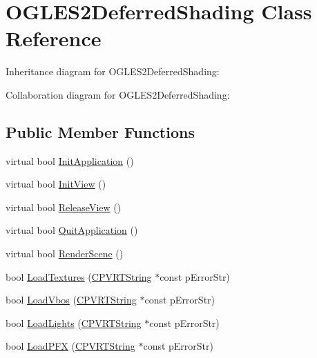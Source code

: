 \hypertarget{class_o_g_l_e_s2_deferred_shading}{\section{O\+G\+L\+E\+S2\+Deferred\+Shading Class Reference}
\label{class_o_g_l_e_s2_deferred_shading}
}


Inheritance diagram for O\+G\+L\+E\+S2\+Deferred\+Shading\+:


Collaboration diagram for O\+G\+L\+E\+S2\+Deferred\+Shading\+:
\subsection*{Public Member Functions}
\begin{DoxyCompactItemize}
\item 
virtual bool \hyperlink{class_o_g_l_e_s2_deferred_shading_a7924c712514baff744873436c9bea61e}{Init\+Application} ()
\item 
virtual bool \hyperlink{class_o_g_l_e_s2_deferred_shading_aeb9543c58a12a0c390331558cf960bdc}{Init\+View} ()
\item 
virtual bool \hyperlink{class_o_g_l_e_s2_deferred_shading_ae565e305e7a00c5ce168b5e24b528beb}{Release\+View} ()
\item 
virtual bool \hyperlink{class_o_g_l_e_s2_deferred_shading_ae259140c9281e119609d13ed8af0fbd9}{Quit\+Application} ()
\item 
virtual bool \hyperlink{class_o_g_l_e_s2_deferred_shading_aa5fb331badd65785c52334fadbbdf3b8}{Render\+Scene} ()
\item 
bool \hyperlink{class_o_g_l_e_s2_deferred_shading_ac04009ab56364958babab5b5afcd3dc7}{Load\+Textures} (\hyperlink{class_c_p_v_r_t_string}{C\+P\+V\+R\+T\+String} $\ast$const p\+Error\+Str)
\item 
bool \hyperlink{class_o_g_l_e_s2_deferred_shading_a6668143c9cf2c947a98dbf14d6d1cbc1}{Load\+Vbos} (\hyperlink{class_c_p_v_r_t_string}{C\+P\+V\+R\+T\+String} $\ast$const p\+Error\+Str)
\item 
bool \hyperlink{class_o_g_l_e_s2_deferred_shading_a602479fd9c6d9a9983e6c1c239f94f59}{Load\+Lights} (\hyperlink{class_c_p_v_r_t_string}{C\+P\+V\+R\+T\+String} $\ast$const p\+Error\+Str)
\item 
bool \hyperlink{class_o_g_l_e_s2_deferred_shading_a4bda3d508a363b5fbe9377328f9d4296}{Load\+P\+F\+X} (\hyperlink{class_c_p_v_r_t_string}{C\+P\+V\+R\+T\+String} $\ast$const p\+Error\+Str)
\item 

\end{DoxyCompactItemize}
